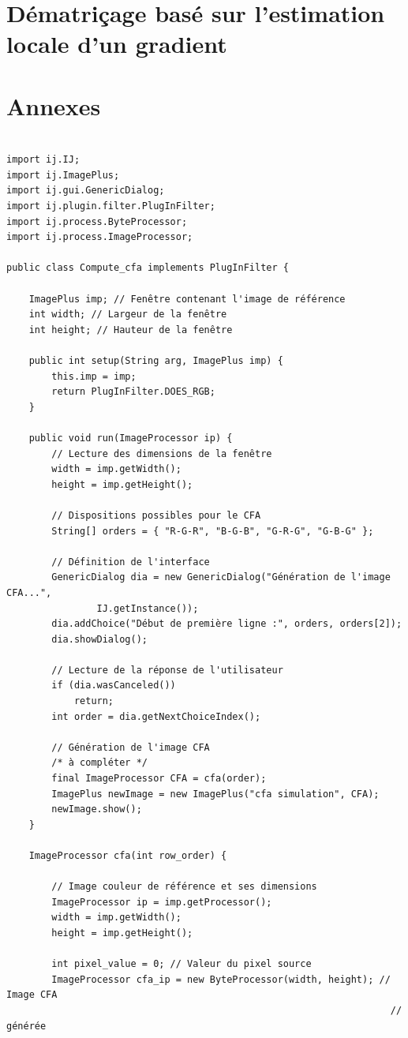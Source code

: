 \documentclass[a4paper,11pt]{article}
\begin{document}
  \section{Dématriçage basé sur l'estimation locale d'un gradient}
  
 
  \section{Annexes}
  
  \begin{lstlisting}[caption=Code du premier exercie]
   
import ij.IJ;
import ij.ImagePlus;
import ij.gui.GenericDialog;
import ij.plugin.filter.PlugInFilter;
import ij.process.ByteProcessor;
import ij.process.ImageProcessor;

public class Compute_cfa implements PlugInFilter {

	ImagePlus imp; // Fenêtre contenant l'image de référence
	int width; // Largeur de la fenêtre
	int height; // Hauteur de la fenêtre

	public int setup(String arg, ImagePlus imp) {
		this.imp = imp;
		return PlugInFilter.DOES_RGB;
	}

	public void run(ImageProcessor ip) {
		// Lecture des dimensions de la fenêtre
		width = imp.getWidth();
		height = imp.getHeight();

		// Dispositions possibles pour le CFA
		String[] orders = { "R-G-R", "B-G-B", "G-R-G", "G-B-G" };

		// Définition de l'interface
		GenericDialog dia = new GenericDialog("Génération de l'image CFA...",
				IJ.getInstance());
		dia.addChoice("Début de première ligne :", orders, orders[2]);
		dia.showDialog();

		// Lecture de la réponse de l'utilisateur
		if (dia.wasCanceled())
			return;
		int order = dia.getNextChoiceIndex();

		// Génération de l'image CFA
		/* à compléter */
		final ImageProcessor CFA = cfa(order);
		ImagePlus newImage = new ImagePlus("cfa simulation", CFA);
		newImage.show();
	}

	ImageProcessor cfa(int row_order) {

		// Image couleur de référence et ses dimensions
		ImageProcessor ip = imp.getProcessor();
		width = imp.getWidth();
		height = imp.getHeight();

		int pixel_value = 0; // Valeur du pixel source
		ImageProcessor cfa_ip = new ByteProcessor(width, height); // Image CFA
																	// générée


\end{lstlisting}
\end{document}
